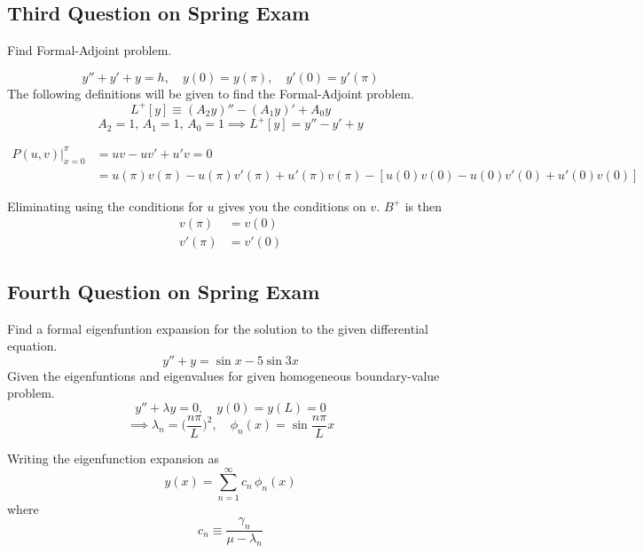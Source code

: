 \subsection{Third Question on Spring Exam}
Find Formal-Adjoint problem.

\begin{equation}
    y''+y'+y=h,\quad y(0)=y(\pi),\quad y'(0)=y'(\pi)
\end{equation}
The following definitions will be given to find the Formal-Adjoint problem.
\begin{equation*}
    L^+[y] \equiv (A_2y)'' - (A_1y)' + A_0y
\end{equation*}
\begin{equation*}
    A_2=1,\,A_1=1,\,A_0=1 \implies L^+[y] = y''-y'+y
\end{equation*}

\begin{align*}
    P(u,v)|_{x=0}^\pi & = uv-uv'+u'v = 0 \\
    & = u(\pi)v(\pi) - u(\pi)v'(\pi) + u'(\pi)v(\pi) - [u(0)v(0) - u(0)v'(0) + u'(0)v(0)]
\end{align*}

Eliminating using the conditions for $u$ gives you the conditions on $v$. $B^+$ is then
\begin{align*}
    v(\pi) & =v(0) \\
    v'(\pi) & =v'(0)
\end{align*}


\subsection{Fourth Question on Spring Exam}
Find a formal eigenfuntion expansion for the solution to the given differential equation.
\begin{equation}
    y''+ y = \sin x - 5\sin 3x
\end{equation}
Given the eigenfuntions and eigenvalues for given homogeneous boundary-value problem.
\begin{equation*}
    y''+ \lambda y = 0, \quad y(0) = y(L) = 0
\end{equation*}
\begin{equation*}
    \implies \lambda_n = \bigg(\frac{n\pi}{L}\bigg)^2, \quad \phi_n(x) = \sin{\frac{n\pi}{L}x}
\end{equation*}

Writing the eigenfunction expansion as 
\begin{equation*}
    y(x) = \sum_{n=1}^\infty c_n \, \phi_n(x)
\end{equation*}
where
\begin{equation*}
    c_n \equiv \frac{\gamma_n}{\mu-\lambda_n}
\end{equation*}

